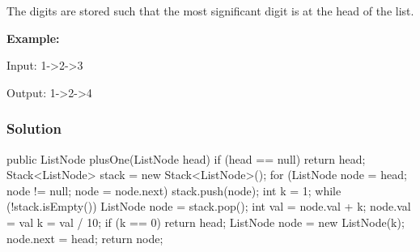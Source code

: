 The digits are stored such that the most significant digit is at the head of the list.

\textbf{Example:}
\begin{Code}
Input:
1->2->3

Output:
1->2->4
\end{Code}

\subsubsection{Solution}

\begin{Code}
public ListNode plusOne(ListNode head) {
    if (head == null) {
        return head;
    }
    Stack<ListNode> stack = new Stack<ListNode>();
    for (ListNode node = head; node != null; node = node.next) {
        stack.push(node);
    }
    int k = 1;
    while (!stack.isEmpty()) {
        ListNode node = stack.pop();
        int val = node.val + k;
        node.val = val %
        k = val / 10;
        if (k == 0) {
            return head;
        }
    }
    ListNode node = new ListNode(k);
    node.next = head;
    return node;
}
\end{Code}

\newpage
